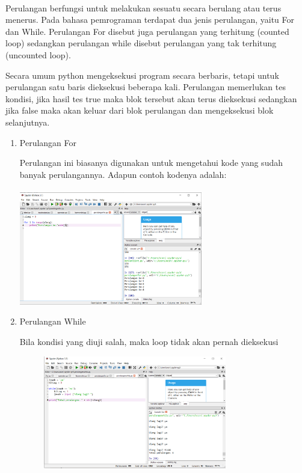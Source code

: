 \paragraph{}
            Perulangan berfungsi untuk melakukan sesuatu secara berulang atau terus menerus. Pada bahasa pemrograman terdapat dua jenis perulangan, yaitu For dan While. Perulangan For disebut juga perulangan yang terhitung (counted loop) sedangkan perulangan while disebut perulangan yang tak terhitung (uncounted loop).
            \par
            Secara umum python mengeksekusi program secara berbaris, tetapi untuk perulangan satu baris dieksekusi beberapa kali. Perulangan memerlukan tes kondisi, jika hasil tes true maka blok tersebut akan terus dieksekusi sedangkan jika false maka akan keluar dari blok perulangan dan mengeksekusi blok selanjutnya.
\begin{enumerate}
    \item Perulangan For
    \par Perulangan ini biasanya digunakan untuk mengetahui kode yang sudah banyak perulangannya. Adapun contoh kodenya adalah:
    \paragraph{}
                 \centerline{\includegraphics[width=8cm]{gambar/perulanganfor.PNG}}
    
    \item Perulangan While
    \par Bila kondisi yang diuji salah, maka loop tidak akan pernah dieksekusi
    \begin{figure}[h]
                 \centerline{\includegraphics[width=8cm]{gambar/perulanganwhile.PNG}}
        \end{figure}
    
\end{enumerate}

